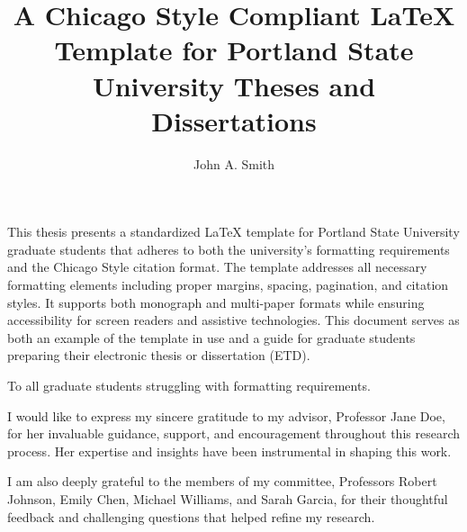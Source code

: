 \documentclass{psu-thesis}
\title{A Chicago Style Compliant \LaTeX{} Template for Portland State University Theses and Dissertations}
\author{John A. Smith} %
\begin{document}
\maketitle

\makecopyright

\begin{psuabstract}
This thesis presents a standardized \LaTeX{} template for Portland State University graduate students that adheres to both the university's formatting requirements and the Chicago Style citation format. The template addresses all necessary formatting elements including proper margins, spacing, pagination, and citation styles. It supports both monograph and multi-paper formats while ensuring accessibility for screen readers and assistive technologies. This document serves as both an example of the template in use and a guide for graduate students preparing their electronic thesis or dissertation (ETD).

\lipsum[1]
\end{psuabstract}

\begin{psudedication}
To all graduate students struggling with formatting requirements.
\end{psudedication}

\begin{psuacknowledgments}
I would like to express my sincere gratitude to my advisor, Professor Jane Doe, for her invaluable guidance, support, and encouragement throughout this research process. Her expertise and insights have been instrumental in shaping this work.

I am also deeply grateful to the members of my committee, Professors Robert Johnson, Emily Chen, Michael Williams, and Sarah Garcia, for their thoughtful feedback and challenging questions that helped refine my research.

\lipsum[2]
\end{psuacknowledgments}

\tableofcontents
\clearpage

\listoftables
\clearpage

\listoffigures
\clearpage
\end{document}
